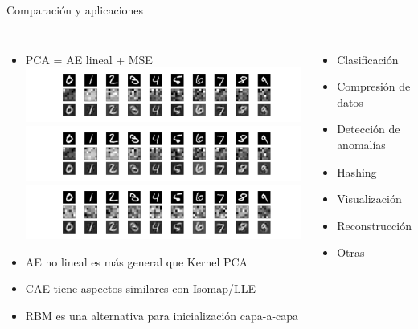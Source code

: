 \begin{frame}{Comparación y aplicaciones}
\begin{columns}[t]

\begin{itemize}
\item PCA = AE lineal + MSE
\includegraphics[width=0.9\columnwidth,trim={14em 16.5em 12em 1.5em},clip]{../inffus/pca-36.pdf}\\\vspace{-.1cm}
  \includegraphics[width=0.9\columnwidth,trim={14em 2em 12em 17em},clip]{../inffus/pca-36.pdf}\\\vspace{-.1cm}
  \includegraphics[width=0.9\columnwidth,trim={14em 2em 12em 17em},clip]{../inffus/basic-36-linear-rmsprop-mse.pdf}

\item AE no lineal es más general que Kernel PCA
\item CAE tiene aspectos similares con Isomap/LLE
\item RBM es una alternativa para inicialización capa-a-capa
\end{itemize}



\begin{itemize}
\item Clasificación
\item Compresión de datos
\item Detección de anomalías
\item Hashing
\item Visualización
\item Reconstrucción
\item Otras
\end{itemize}

\end{columns}
\end{frame}

